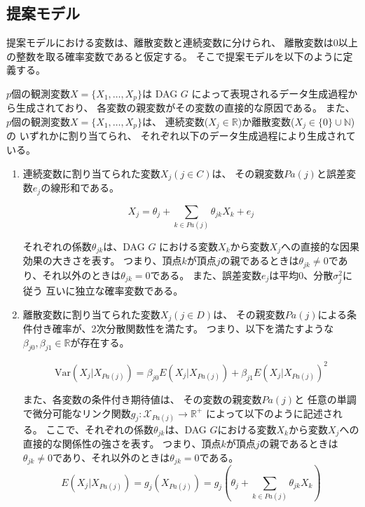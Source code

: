 
\subsection{提案モデル}

提案モデルにおける変数は、離散変数と連続変数に分けられ、
離散変数は0以上の整数を取る確率変数であると仮定する。
そこで提案モデルを以下のように定義する。

\begin{df}[提案モデル] \label{prop_model}
  $p$個の観測変数$X = \{ X_1, \dots, X_p \}$は
  DAG $G$ によって表現されるデータ生成過程から生成されており、
  各変数の親変数がその変数の直接的な原因である。
  また、$p$個の観測変数$X = \{ X_1, \dots, X_p \}$は、
  連続変数($X_j \in \mathbb R$)か離散変数($X_j \in \{0 \}\cup \mathbb N$)の
  いずれかに割り当てられ、
  それぞれ以下のデータ生成過程により生成されている。

  \begin{enumerate}
    \setlength{\itemsep}{0.3cm}
    \item
    連続変数に割り当てられた変数$X_j (j \in C)$は、
    その親変数$Pa(j)$と誤差変数$e_j$の線形和である。

    \begin{equation}
      X_j = \theta_{j} + \sum_{k \in Pa(j)} \theta_{jk}X_k + e_j
      \label{eq:anm_prop}
    \end{equation}

    それぞれの係数$\theta_{jk}$は、DAG $G$ における変数$X_k$から変数$X_j$への直接的な因果効果の大きさを表す。
    つまり、頂点$k$が頂点$j$の親であるときは$\theta_{jk} \neq 0$であり、それ以外のときは$\theta_{jk} = 0$である。
    また、誤差変数$e_j$は平均0、分散$\sigma_j^2$に従う
    互いに独立な確率変数である。

    \item
    離散変数に割り当てられた変数$X_j (j \in D)$は、
    その親変数$Pa(j)$による条件付き確率が、2次分散関数性を満たす。
    つまり、以下を満たすような$\beta_{j0},\beta_{j1} \in \mathbb{R}$が存在する。

    \begin{equation}
      \mathrm{Var}(X_j|X_{Pa(j)}) = \beta_{j0} E(X_j | X_{Pa(j)}) + \beta_{j1} E(X_j | X_{Pa(j)})^2
      \label{QVF_prop}
    \end{equation}

    また、各変数の条件付き期待値は、
    その変数の親変数$Pa(j)$と
    任意の単調で微分可能なリンク関数$g_j \colon \mathcal X_{Pa(j)} \rightarrow \mathbb R^+$
    によって以下のように記述される。
    ここで、それぞれの係数$\theta_{jk}$は、DAG $G$における変数$X_k$から変数$X_j$への直接的な関係性の強さを表す。
    つまり、頂点$k$が頂点$j$の親であるときは$\theta_{jk} \neq 0$であり、それ以外のときは$\theta_{jk} = 0$である。
    \begin{equation*}
      E(X_j | X_{Pa(j)})
      = g_j(X_{Pa(j)})
      = g_j \left(\theta_j + \sum_{k \in Pa(j)} \theta_{jk}X_k \right)
    \end{equation*}

  \end{enumerate}
\end{df}

